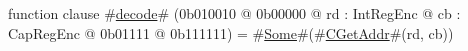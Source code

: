 function clause #\hyperref[sailMIPSzdecode]{decode}# (0b010010 @ 0b00000 @ rd : IntRegEnc @ cb : CapRegEnc @   0b01111 @ 0b111111) = #\hyperref[sailMIPSzSome]{Some}#(#\hyperref[sailMIPSzCGetAddr]{CGetAddr}#(rd, cb))
